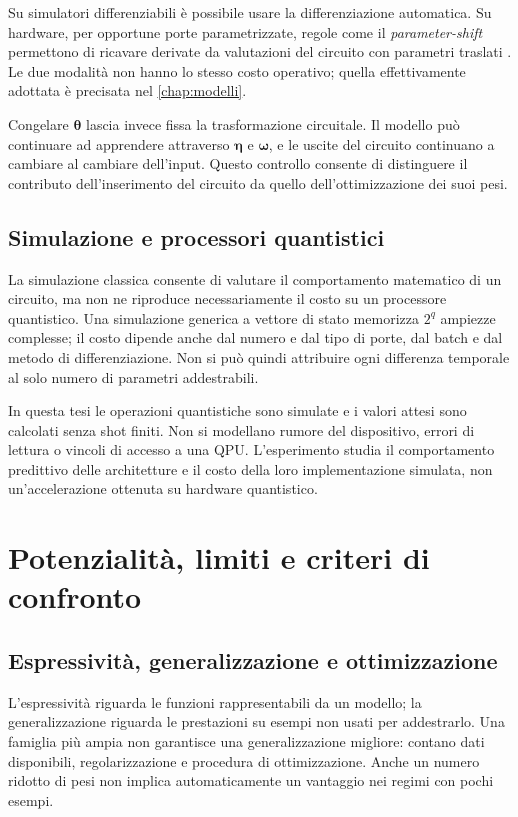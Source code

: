 Su simulatori differenziabili è possibile usare la differenziazione
automatica. Su hardware, per opportune porte parametrizzate, regole come
il \emph{parameter-shift} permettono di ricavare derivate da valutazioni
del circuito con parametri traslati \cite{schuld2019gradients}. Le due
modalità non hanno lo stesso costo operativo; quella effettivamente
adottata è precisata nel \cref{chap:modelli}.

Congelare \(\boldsymbol\theta\) lascia invece fissa la trasformazione
circuitale. Il modello può continuare ad apprendere attraverso
\(\boldsymbol\eta\) e \(\boldsymbol\omega\), e le uscite del circuito
continuano a cambiare al cambiare dell'input. Questo controllo consente
di distinguere il contributo dell'inserimento del circuito da quello
dell'ottimizzazione dei suoi pesi.

\subsection{Simulazione e processori quantistici}

La simulazione classica consente di valutare il comportamento matematico
di un circuito, ma non ne riproduce necessariamente il costo su un
processore quantistico. Una simulazione generica a vettore di stato
memorizza \(2^q\) ampiezze complesse; il costo dipende anche dal numero
e dal tipo di porte, dal batch e dal metodo di differenziazione.
Non si può quindi attribuire ogni differenza temporale al solo numero
di parametri addestrabili.

In questa tesi le operazioni quantistiche sono simulate e i valori attesi
sono calcolati senza shot finiti. Non si modellano rumore del dispositivo,
errori di lettura o vincoli di accesso a una QPU. L'esperimento studia
il comportamento predittivo delle architetture e il costo della loro
implementazione simulata, non un'accelerazione ottenuta su hardware
quantistico.

\section{Potenzialità, limiti e criteri di confronto}
\label{sec:fond-confronto}

\subsection{Espressività, generalizzazione e ottimizzazione}

L'espressività riguarda le funzioni rappresentabili da un modello;
la generalizzazione riguarda le prestazioni su esempi non usati per
addestrarlo. Una famiglia più ampia non garantisce una generalizzazione
migliore: contano dati disponibili, regolarizzazione e procedura di
ottimizzazione. Anche un numero ridotto di pesi non implica automaticamente
un vantaggio nei regimi con pochi esempi.

